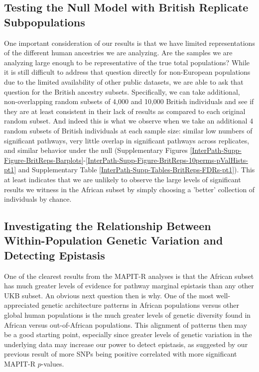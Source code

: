 \documentclass[12pt, a4paper]{article}
\begin{document}

\subsection{Testing the Null Model with British Replicate Subpopulations}

One important consideration of our results is that we have limited representations of the different human ancestries we are analyzing. Are the samples we are analyzing large enough to be representative of the true total populations? While it is still difficult to address that question directly for non-European populations due to the limited availability of other public datasets, we are able to ask that question for the British ancestry subsets. Specifically, we can take additional, non-overlapping random subsets of 4,000 and 10,000 British individuals and see if they are at least consistent in their lack of results as compared to each original random subset. And indeed this is what we observe when we take an additional 4 random subsets of British individuals at each sample size: similar low numbers of significant pathways, very little overlap in significant pathways across replicates, and similar behavior under the null (Supplementary Figures \ref{InterPath-Supp-Figure-BritReps-Barplots}-\ref{InterPath-Supp-Figure-BritReps-10perms-pValHists-pt1} and Supplementary Table \ref{InterPath-Supp-Tables-BritReps-FDRs-pt1}). This at least indicates that we are unlikely to observe the large levels of significant results we witness in the African subset by simply choosing a 'better' collection of individuals by chance.  

\subsection{Investigating the Relationship Between Within-Population Genetic Variation and Detecting Epistasis}

One of the clearest results from the MAPIT-R analyses is that the African subset has much greater levels of evidence for pathway marginal epistasis than any other UKB subset. An obvious next question then is why. One of the most well-appreciated genetic architecture patterns in African populations versus other global human populations is the much greater levels of genetic diversity found in African versus out-of-African populations. This alignment of patterns then may be a good starting point, especially since greater levels of genetic variation in the underlying data may increase our power to detect epistasis, as suggested by our previous result of more SNPs being positive correlated with more significant MAPIT-R $p$-values. 
\end{document}
